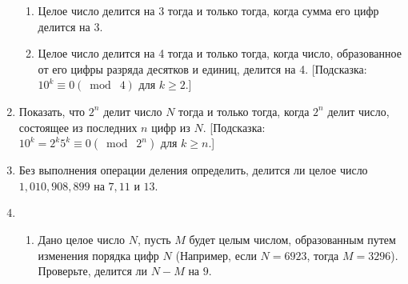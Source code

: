 \documentclass[11pt]{article}
\begin{document}
\begin{enumerate}
\begin{enumerate}
\item Целое число делится на 3 тогда и только тогда, когда сумма его цифр делится на 3.
\item Целое число делится на 4 тогда и только тогда, когда число, образованное от его цифры разряда десятков и единиц, делится на 4. [Подсказка: $10^{k}\equiv0(\bmod\; 4)$ для $ k\geq2 $.]
\end{enumerate}
\item Показать, что $ 2^{n} $ делит число $N$ тогда и только тогда, когда  $ 2^{n} $ делит число, состоящее из последних $n$ цифр из $N$. [Подсказка: $10^{k}=2^{k}5^{k}\equiv0(\bmod\; 2^{n}) $ для $ k\geq n $.]
\item Без выполнения операции деления определить, делится ли целое число $1,010,908,899 $ на $ 7,11 $ и $13$.
\item 
\begin{enumerate}
\item Дано целое число $N$, пусть $M$ будет целым числом, образованным путем изменения порядка цифр $N$ (Например, если $N=6923$, тогда $M=3296$).\\ Проверьте, делится ли $N-M$ на $9$.
\end{enumerate}
\end{enumerate}
\end{document}
